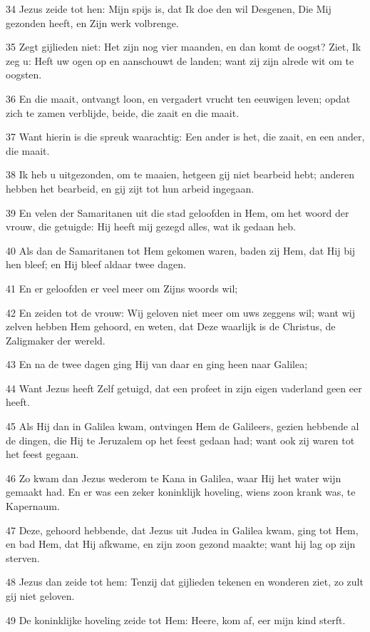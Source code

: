 \par 34 Jezus zeide tot hen: Mijn spijs is, dat Ik doe den wil Desgenen, Die Mij gezonden heeft, en Zijn werk volbrenge.
\par 35 Zegt gijlieden niet: Het zijn nog vier maanden, en dan komt de oogst? Ziet, Ik zeg u: Heft uw ogen op en aanschouwt de landen; want zij zijn alrede wit om te oogsten.
\par 36 En die maait, ontvangt loon, en vergadert vrucht ten eeuwigen leven; opdat zich te zamen verblijde, beide, die zaait en die maait.
\par 37 Want hierin is die spreuk waarachtig: Een ander is het, die zaait, en een ander, die maait.
\par 38 Ik heb u uitgezonden, om te maaien, hetgeen gij niet bearbeid hebt; anderen hebben het bearbeid, en gij zijt tot hun arbeid ingegaan.
\par 39 En velen der Samaritanen uit die stad geloofden in Hem, om het woord der vrouw, die getuigde: Hij heeft mij gezegd alles, wat ik gedaan heb.
\par 40 Als dan de Samaritanen tot Hem gekomen waren, baden zij Hem, dat Hij bij hen bleef; en Hij bleef aldaar twee dagen.
\par 41 En er geloofden er veel meer om Zijns woords wil;
\par 42 En zeiden tot de vrouw: Wij geloven niet meer om uws zeggens wil; want wij zelven hebben Hem gehoord, en weten, dat Deze waarlijk is de Christus, de Zaligmaker der wereld.
\par 43 En na de twee dagen ging Hij van daar en ging heen naar Galilea;
\par 44 Want Jezus heeft Zelf getuigd, dat een profeet in zijn eigen vaderland geen eer heeft.
\par 45 Als Hij dan in Galilea kwam, ontvingen Hem de Galileers, gezien hebbende al de dingen, die Hij te Jeruzalem op het feest gedaan had; want ook zij waren tot het feest gegaan.
\par 46 Zo kwam dan Jezus wederom te Kana in Galilea, waar Hij het water wijn gemaakt had. En er was een zeker koninklijk hoveling, wiens zoon krank was, te Kapernaum.
\par 47 Deze, gehoord hebbende, dat Jezus uit Judea in Galilea kwam, ging tot Hem, en bad Hem, dat Hij afkwame, en zijn zoon gezond maakte; want hij lag op zijn sterven.
\par 48 Jezus dan zeide tot hem: Tenzij dat gijlieden tekenen en wonderen ziet, zo zult gij niet geloven.
\par 49 De koninklijke hoveling zeide tot Hem: Heere, kom af, eer mijn kind sterft.
